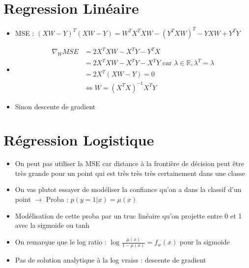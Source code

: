 \documentclass{article}
\begin{document}
\begin{multicols}{2}
\section{Regression Linéaire}
\begin{itemize}
    \item MSE : $ (XW - Y)^T (XW - Y) = W^T X^T X W - (Y^T X W)^T - YXW + Y^TY $ 
    \item \begin{align*}
        \nabla _W MSE &= 2X^TXW - X^T Y - Y^T X  \\
            &= 2X^TXW - X^T Y - X^TY  \text{ car } \lambda \in \mathbb{R}, \lambda ^T = \lambda \\
            &= 2X^T (XW - Y) = 0 \\
            &\Leftrightarrow W = (X^TX)^{-1} X^T Y
    \end{align*}
    \item Sinon descente de gradient
\end{itemize}

\section{Régression Logistique}
\begin{itemize}
    \item On peut pas utiliser la MSE car distance à la frontière de décision peut être très grande pour un point qui est très très très certainement dans une classe
    \item On vas plutot essayer de modéliser la confiance qu'on a dans la classif d'un point $\rightarrow$ Proba : $ p(y=1|x) = \mu (x) $ 
    \item Modélisation de cette proba par un truc linéaire qu'on projette entre 0 et 1 avec la sigmoide ou tanh  
    \item On remarque que le log ratio : $ \log_{} \frac{\mu (x)}{1 - \mu (x)} = f_w(x) $ pour la sigmoide 
    \item Pas de solution analytique à la log vraiss : descente de gradient
\end{itemize}




\end{multicols}
\end{document}
